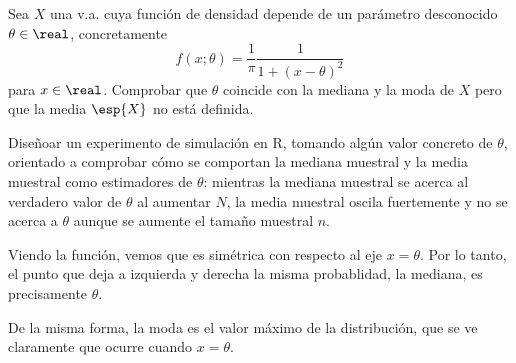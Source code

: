 \begin{problem}[5] Sea $X$ una v.a. cuya función de densidad depende de un parámetro desconocido $\theta \in \real$, concretamente \[ f(x;\theta) = \frac{1}{\pi}\frac{1}{1+(x-\theta)^2} \] para $x\in \real$. Comprobar que $\theta$ coincide con la mediana y la moda de $X$ pero que la media $\esp{X}$ no está definida.

Diseñoar un experimento de simulación en R, tomando algún valor concreto de $\theta$, orientado a comprobar cómo se comportan la mediana muestral y la media muestral como estimadores de $\theta$: mientras la mediana muestral se acerca al verdadero valor de $\theta$ al aumentar $N$, la media muestral oscila fuertemente y no se acerca a $\theta$ aunque se aumente el tamaño muestral $n$.

\solution Viendo la función, vemos que es simétrica con respecto al eje $x= \theta$. Por lo tanto, el punto que deja a izquierda y derecha la misma probablidad, la mediana, es precisamente $\theta$. 

De la misma forma, la moda es el valor máximo de la distribución, que se ve claramente que ocurre cuando $x=\theta$.
\end{problem}

